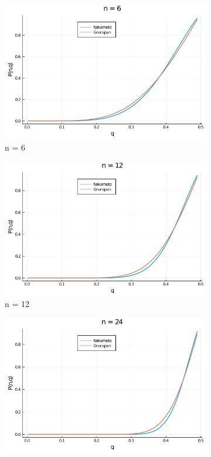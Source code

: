\documentclass{article}
\begin{document}
\begin{figure}[H]
\begin{subfigure}{0.6\textwidth}
                \includegraphics[width=\linewidth]{img/n=6.png}
                \caption{n = 6}
            \end{subfigure}
            \begin{subfigure}{0.6\textwidth}
                \centering
                \includegraphics[width=\linewidth]{img/n=12.png}
                \caption{n = 12}
            \end{subfigure}
            \begin{subfigure}{0.6\textwidth}
                \centering
                \includegraphics[width=\linewidth]{img/n=24.png}

\end{subfigure}
\end{figure}
\end{document}
